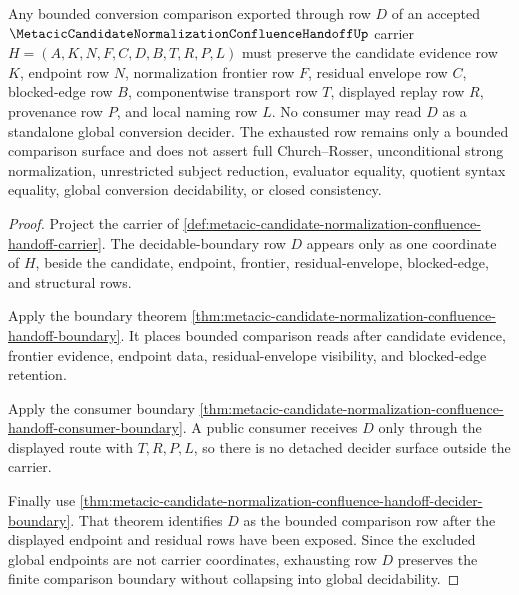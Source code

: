 \begin{theorem}
\label{thm:metacic-candidate-normalization-confluence-handoff-decider-row-exhaustion}
Any bounded conversion comparison exported through row $D$ of an accepted $\MetacicCandidateNormalizationConfluenceHandoffUp$ carrier $H=(A,K,N,F,C,D,B,T,R,P,L)$ must preserve the candidate evidence row $K$, endpoint row $N$, normalization frontier row $F$, residual envelope row $C$, blocked-edge row $B$, componentwise transport row $T$, displayed replay row $R$, provenance row $P$, and local naming row $L$. No consumer may read $D$ as a standalone global conversion decider. The exhausted row remains only a bounded comparison surface and does not assert full Church--Rosser, unconditional strong normalization, unrestricted subject reduction, evaluator equality, quotient syntax equality, global conversion decidability, or closed consistency.
\end{theorem}
\begin{proof}
Project the carrier of \autoref{def:metacic-candidate-normalization-confluence-handoff-carrier}. The decidable-boundary row $D$ appears only as one coordinate of $H$, beside the candidate, endpoint, frontier, residual-envelope, blocked-edge, and structural rows.

Apply the boundary theorem \autoref{thm:metacic-candidate-normalization-confluence-handoff-boundary}. It places bounded comparison reads after candidate evidence, frontier evidence, endpoint data, residual-envelope visibility, and blocked-edge retention.

Apply the consumer boundary \autoref{thm:metacic-candidate-normalization-confluence-handoff-consumer-boundary}. A public consumer receives $D$ only through the displayed route with $T,R,P,L$, so there is no detached decider surface outside the carrier.

Finally use \autoref{thm:metacic-candidate-normalization-confluence-handoff-decider-boundary}. That theorem identifies $D$ as the bounded comparison row after the displayed endpoint and residual rows have been exposed. Since the excluded global endpoints are not carrier coordinates, exhausting row $D$ preserves the finite comparison boundary without collapsing into global decidability.
\end{proof}

